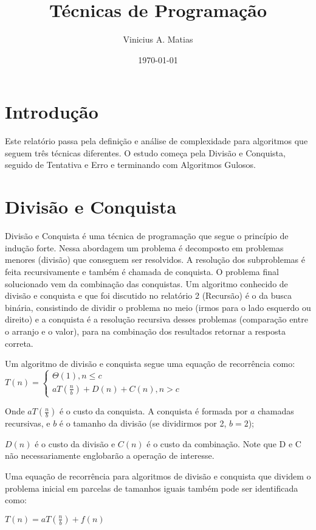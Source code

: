 \documentclass[a4paper, twocolumn]{article}
\title{Técnicas de Programação}
\author{Vinicius A. Matias}
\date{\today}
\theoremstyle{definition}
\begin{document}
	\maketitle
	
	\section{Introdução}
	Este relatório passa pela definição e análise de complexidade para algoritmos que seguem três técnicas diferentes. O estudo começa pela Divisão e Conquista, seguido de Tentativa e Erro e terminando com Algoritmos Gulosos.
	
	\section{Divisão e Conquista}
	Divisão e Conquista é uma técnica de programação que segue o princípio de indução forte. Nessa abordagem um problema é decomposto em problemas menores (divisão) que conseguem ser resolvidos. A resolução dos subproblemas é feita recursivamente e também é chamada de conquista. O problema final solucionado vem da combinação das conquistas. Um algoritmo conhecido de divisão e conquista e que foi discutido no relatório 2 (Recursão) é o da busca binária, consistindo de dividir o problema no meio (irmos para o lado esquerdo ou direito) e a conquista é a resolução recursiva desses problemas (comparação entre o arranjo e o valor), para na combinação dos resultados retornar a resposta correta.
	
	Um algoritmo de divisão e conquista segue uma equação de recorrência como: \\
	
	$T(n) = \begin{cases} 
		\Theta(1), n  \leq c\\
		aT(\frac{n}{b}) + D(n) + C(n), n > c
	\end{cases}$
	
	Onde $aT(\frac{n}{b})$ é o custo da conquista. A conquista é formada por $a$ chamadas recursivas, e $b$ é o tamanho da divisão (se dividirmos por 2, $b=2$);
	
	$D(n)$ é o custo da divisão e $C(n)$ é o custo da combinação. Note que D e C não necessariamente englobarão a operação de interesse.

	Uma equação de recorrência para algoritmos de divisão e conquista que dividem o problema inicial em parcelas de tamanhos iguais também pode ser identificada como:
	
	$T(n) = aT(\frac{n}{b}) + f(n)$
	
\end{document}
